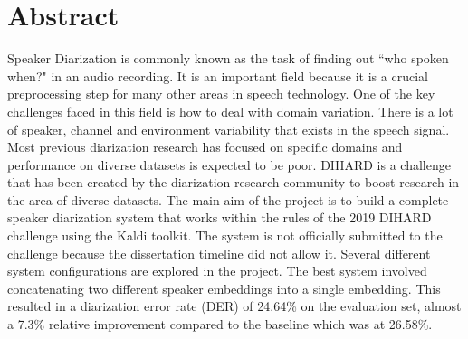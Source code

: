 \chapter*{\Large \center Abstract}

Speaker Diarization is commonly known as the task of finding out ``who spoken when?" in an audio recording. It is an important field because it is a crucial preprocessing step for many other areas in speech technology. One of the key challenges faced in this field is how to deal with domain variation. There is a lot of speaker, channel and environment variability that exists in the speech signal. Most previous diarization research has focused on specific domains and performance on diverse datasets is expected to be poor. DIHARD is a challenge that has been created by the diarization research community to boost research in the area of diverse datasets. The main aim of the project is to build a complete speaker diarization system that works within the rules of the 2019 DIHARD challenge using the Kaldi toolkit. The system is not officially submitted to the challenge because the dissertation timeline did not allow it. Several different system configurations are explored in the project. The best system involved concatenating two different speaker embeddings into a single embedding. This resulted in a diarization error rate (DER) of 24.64\% on the evaluation set, almost a 7.3\% relative improvement compared to the baseline which was at 26.58\%.

